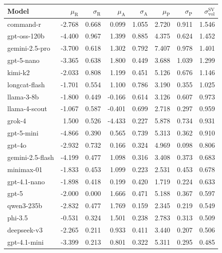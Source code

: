 \documentclass[11pt]{article}
\begin{document}
\begin{table}[t]
\centering
\scriptsize
\setlength{\tabcolsep}{3.5pt}
\begin{tabular}{l r r r r r r r}
\toprule
\textbf{Model} &
$\mu_{\text{R}}$ & $\sigma_{\text{R}}$ &
$\mu_{\text{A}}$ & $\sigma_{\text{A}}$ &
$\mu_{\text{P}}$ & $\sigma_{\text{P}}$ &
$\sigma^{\text{SV}}_{\text{vol}}$ \\
\midrule
command-r        & -2.768 & 0.668 &  0.099 & 1.055 & 2.720 & 0.911 & 1.546 \\
gpt-oss-120b     & -4.400 & 0.967 &  1.399 & 0.885 & 4.375 & 0.624 & 1.452 \\
gemini-2.5-pro   & -3.700 & 0.618 &  1.302 & 0.792 & 7.407 & 0.978 & 1.401 \\
gpt-5-nano       & -3.365 & 0.638 &  1.800 & 0.449 & 3.688 & 1.039 & 1.299 \\
kimi-k2          & -2.033 & 0.808 &  1.199 & 0.451 & 5.126 & 0.676 & 1.146 \\
longcat-flash    & -1.701 & 0.554 &  1.100 & 0.786 & 3.190 & 0.355 & 1.025 \\
llama-3-8b       & -1.800 & 0.449 & -0.166 & 0.614 & 3.126 & 0.607 & 0.973 \\
llama-4-scout    & -1.067 & 0.587 & -0.401 & 0.699 & 2.718 & 0.297 & 0.959 \\
grok-4           &  1.500 & 0.526 & -4.433 & 0.227 & 5.878 & 0.734 & 0.931 \\
gpt-5-mini       & -4.866 & 0.390 &  0.565 & 0.739 & 5.313 & 0.362 & 0.910 \\
gpt-4o           & -2.932 & 0.732 &  0.166 & 0.324 & 4.969 & 0.098 & 0.806 \\
gemini-2.5-flash & -4.199 & 0.477 &  1.098 & 0.316 & 3.408 & 0.373 & 0.683 \\
minimax-01       & -1.833 & 0.453 &  1.099 & 0.223 & 2.531 & 0.453 & 0.678 \\
gpt-4.1-nano     & -1.898 & 0.418 &  0.199 & 0.420 & 1.719 & 0.224 & 0.633 \\
gpt-5            & -2.000 & 0.000 &  1.666 & 0.471 & 5.188 & 0.367 & 0.597 \\
qwen3-235b       & -2.832 & 0.477 &  1.769 & 0.159 & 2.345 & 0.219 & 0.549 \\
phi-3.5          & -0.531 & 0.324 &  1.501 & 0.238 & 2.783 & 0.313 & 0.509 \\
deepseek-v3      & -2.265 & 0.211 &  0.933 & 0.411 & 3.440 & 0.207 & 0.506 \\
gpt-4.1-mini     & -3.399 & 0.213 &  0.801 & 0.322 & 5.311 & 0.295 & 0.485 \\

\end{tabular}
\end{table}
\end{document}
